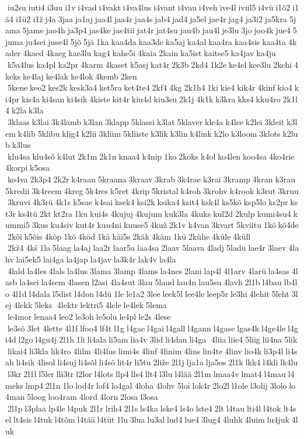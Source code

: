  iu2su iuti4 i3uu i1v i4vad i4vakt i4va4lus i4vant i4vau i4veh ive4l iviil5 i4vü i1õ2 i1ä4 i1ü2 i1ž j4a 3jaa ja1aj jaa4l jaa4r jaa4s jab4 jad4 ja5el jae4r jag4 ja3i2 ja5kra 5jama 5jame jao4h ja3p4 jas4ke jas4tii jat4r jat4su jau4b jau4l je3lu 3jo joo4k jue4 5juma ju4sei juse4l 5jõ 5jä 1ka kaa4da kaa3de ka5aj ka4al kaa4ra kaa4sis kaa4ta 4kader 4kaed 4kaeg kae3lu kag4 kahe5i 4kaia 2kain ka5ist kaitse5 ka4jav ka4ju  k5a4lus ka4pl ka2pr 4karm 4kaset k5asj kat4r 2k3b 2kd4 1k2e ke4el kee3lu 2kehi 4keks ke4laj ke4lak ke4lok 4kemb 2ken  5kene keo2 kes2k kesk3a4 ket5ra ket4te4 2kf4 4kg 2k1h4 1ki kie4 kik4r 4kinf kio4 ki4pr kis4a ki4san ki4sik 4kiste kit4r kiu4d kiu3su 2k1j 4k1k k3kra kks4 kku4ro 2k1l4 k2la k3la  3klaas k3lai 3k4lamb k3lan 3klapp 5klassi k3lat 5klaver kle4a k4lee k2lei 3kleit k3lem k4lib 5klibu klig4 k2lii 3kliim 5kliiste k3lik k3lin k4link k2lo k3loom 3klots k2lub k3lus  klu4sa klu4sõ k4lut 2k1m 2k1n knaa4 k4nip 1ko 2koks k4ol ko4len koo4sa 4ko4rie 4korpi k5osa  ko4va 2k3p4 2k2r k4raan 5kraana 3kraav 3krab 3k4rae k3rai 3kramp 4kran k3rau 5kredii 3k4reem 4kreg 5k4res k5ret 4krip 5kristal k4roh 3krohv k4rook k3rut 3kruu 3kruvi 4k3rü 4k1s k5sae k4sai ksek4 ksi2k ksika4 ksit4 ksk4l ks5kõ ksp5lo ks2pr kst3r ks4tü 2kt kt2ra 1ku kui4s 4kujuj 4kujum kuk3la 4kuks kul2d 2kulp kumi4su4 kummi5 3kus ku4siv kut4r kuu4ni kuuse5 4kuž 2k1v k4van 3kvart 5kviitu 1kõ kõ4de  2kõi k5õis 4kõp 1kö 4köd 1kä käi5s 2käk 4käm 1kü 2kühe 4küle 4küll  2kž4 4kš 1la 5laag la4aj laa2r laar5a laa4sa 2laav 5laava 4ladj 5ladu lae4r 3laev 4lahv lai5ek5 lai4ga la4jap la4jav la3k4r lak4v la4la  4lald la4les 4lals la4lus 3lama 3lamp 4lams la4nes 2lani lap4l 4l1arv 4larü la4sas 4lasb la4sei la4sem 4lasen l2asi 4la4sut 3lau 5laud lau4n lau5su 4lavh 2l1b l4bau lb4lo 4l1d l4dala l5dist l4don l4dü 1le le1a2 3lee leek5l lee4le leep5r le3hi 4lehit 5leht 3lej 4lekk 5leks  4lektr lektri5 4lele le4lek 5lema  le4mor lenaa4 leo2 le3oh le5olu le4pl le2s 4lese  le3sõ 3let 4lette 4l1f lfoo4 lf4t l1g l4gae l4gai l4gall l4gann l4gase lgas4k l4ge4le l4gi4d l2go l4gu4j 2l1h 1li li4ala li5am lia4v 3lid li4dan li4ga  4liia liie4 5liig lii4na 5lik  likai4 li3kla lik4ro 4lilm 4li4lus limi4s 4linf 4linim 4lins lin4te 4linv lio4k li3p4l li4sah li4sik 4lisol li4suj li4sõl li4sö lit4r li5tu 2liže 2l1j lja1a lja5os 2l1k lkk4 l4kli lk4lu l3kr 2l1l l5ler lli3tr l2lor l4lots llp4 lls4 llt4 l3lu l4lää 2l1m lmaa4v lmat4 l4mau l4meks lmp4 2l1n 1lo lod4r lof4 lo4gal 4loha 4lohv 5loi lok4r 2lo2l l1ole l3olij 3lolo lo4man 5loog loo4ram 4lord 4lorn 2losa l3osa  2l1p l3plaa lp4le l4puk 2l1r lrih4 2l1s ls4ka lske4 ls4o lste4 2lt l4tau lti4l l4tok lt4sel lt4sis l4tuk l4tõm l4tää l4tüt 1lu 3lua lu3al lud4 lue4 3lug4 4luhk 4luim lu4juk 4luk 